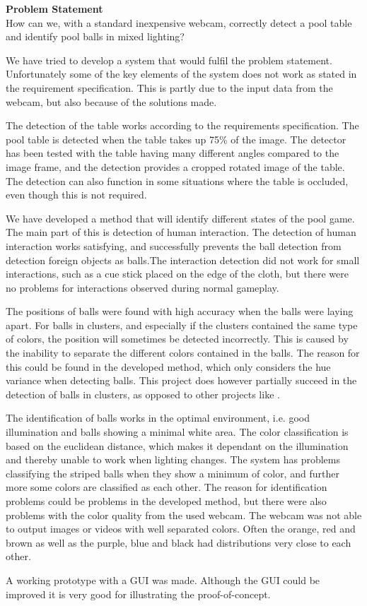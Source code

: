 \textbf{Problem Statement}\\
How can we, with a standard inexpensive webcam, correctly detect a pool table and identify pool balls in mixed lighting?

We have tried to develop a system that would fulfil the problem statement. Unfortunately some of the key elements of the system does not work as stated in the requirement specification. This is partly due to the input data from the webcam, but also because of the solutions made.

The detection of the table works according to the requirements specification. The pool table is detected when the table takes up 75\% of the image. The detector has been tested with the table having many different angles compared to the image frame, and the detection provides a cropped rotated image of the table. The detection can also function in some situations where the table is occluded, even though this is not required.

We have developed a method that will identify different states of the pool game. The main part of this is detection of human interaction. The detection of human interaction works satisfying, and successfully prevents the ball detection from detection foreign objects as balls.The interaction detection did not work for small interactions, such as a cue stick placed on the edge of the cloth, but there were no problems for interactions observed during normal gameplay.

The positions of balls were found with high accuracy when the balls were laying apart. For balls in clusters, and especially if the clusters contained the same type of colors, the position will sometimes be detected incorrectly. This is caused by the inability to separate the different colors contained in the balls. The reason for this could be found in the developed method, which only considers the hue variance when detecting balls. This project does however partially succeed in the detection of balls in clusters, as opposed to other projects like \cite{supportBilliard}.

The identification of balls works in the optimal environment, i.e. good illumination and balls showing a minimal white area. The color classification is based on the euclidean distance, which makes it dependant on the illumination and thereby unable to work when lighting changes.
The system has problems classifying the striped balls when they show a minimum of color, and further more some colors are classified as each other. The reason for identification problems could be problems in the developed method, but there were also problems with the color quality from the used webcam. The webcam was not able to output images or videos with well separated colors. Often the orange, red and brown as well as the purple, blue and black had distributions very close to each other.

A working prototype with a GUI was made. Although the GUI could be improved it is very good for illustrating the proof-of-concept.